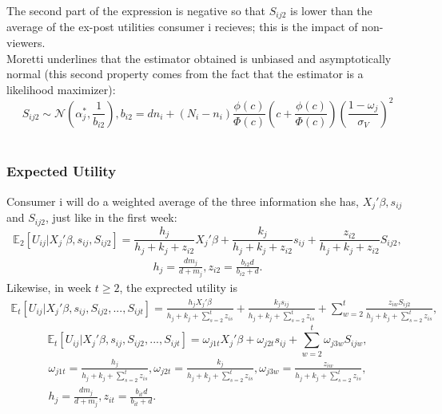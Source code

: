 	The second part of the expression is negative so that $S_{i j 2}$ is lower than the average of the ex-post utilities consumer i recieves; this is the impact of non-viewers.\\
	
	Moretti underlines that the estimator obtained is unbiased and asymptotically normal (this second property comes from the fact that the estimator is a likelihood maximizer): 
	\begin{equation}
		S_{i j 2}\sim\mathcal{N}(\alpha_{j}^{*}, \frac{1}{b_{i 2}}) , b_{i 2}=dn_{i}+(N_{i}-n_{i})\frac{\phi(c)}{\Phi(c)}\left(c+\frac{\phi(c)}{\Phi(c)}\right)(\frac{1-\omega_{j}}{\sigma_{V}})^{2}
	\end{equation}\\
	
	\subsubsection{Expected Utility}
	Consumer i will do a weighted average of the three information she has, $X_{j}'\beta, s_{i j}$ and $S_{i j 2}$, just like in the first week:
	\begin{equation}
		\mathbb{E}_2[U_{i j}|X_{j}'\beta, s_{i j}, S_{i j 2}]=\frac{h_{j}}{h_{j}+k_{j}+z_{i 2}} X_{j}'\beta+\frac{k_{j}}{h_{j}+k_{j}+z_{i 2}}s_{i j}+\frac{z_{i 2}}{h_{j}+k_{j}+z_{i 2}}S_{i j 2}, 
	\end{equation}
	\begin{align*}
		h_{j}=\frac{d m_{j}}{d+m_{j}}, z_{i 2}=\frac{b_{i 2}d}{b_{i 2}+d}.
	\end{align*}
	Likewise, in week $t\geqslant2$, the exprected utility is
	\begin{align*}
	\mathbb{E}_t[U_{i j}|X_{j}'\beta, s_{i j}, S_{i j 2}, ..., S_{i j t}]=\frac{h_{j}X_{j}'\beta}{h_{j}+k_{j}+\sum_{s=2}^{t}z_{i s}} +\frac{k_{j}s_{i j}}{h_{j}+k_{j}+\sum_{s=2}^{t}z_{i s}}+\sum_{w=2}^{t}\frac{z_{i w}S_{i j 2}}{h_{j}+k_{j}+\sum_{s=2}^{t}z_{i s}}, 
	\end{align*}
	\begin{equation}
	\mathbb{E}_t[U_{i j}|X_{j}'\beta, s_{i j}, S_{i j 2}, ..., S_{i j t}]=\omega_{j 1 t}X_{j}'\beta +\omega_{j 2 t}s_{i j}+\sum_{w=2}^{t}\omega_{j 3 w}S_{i j w}, 
	\end{equation}
	\begin{align*}
	\omega_{j 1 t}=\frac{h_{j}}{h_{j}+k_{j}+\sum_{s=2}^{t}z_{i s}}, 
	\omega_{j 2 t}=\frac{k_{j}}{h_{j}+k_{j}+\sum_{s=2}^{t}z_{i s}}, 
	\omega_{j 3 w}=\frac{z_{i w}}{h_{j}+k_{j}+\sum_{s=2}^{t}z_{i s}},\\
	h_{j}=\frac{d m_{j}}{d+m_{j}}, z_{i t}=\frac{b_{i t}d}{b_{i t}+d}.
	\end{align*}
	
